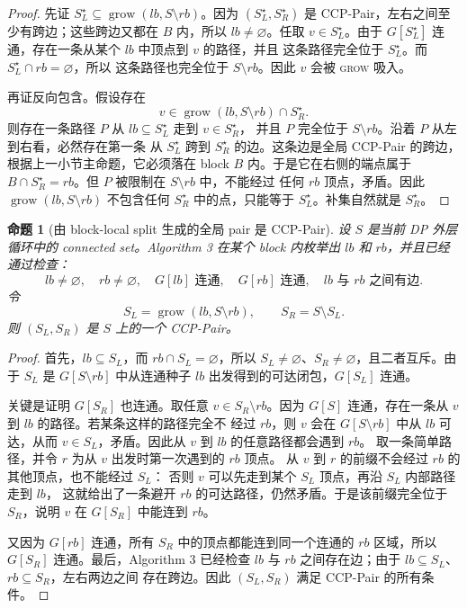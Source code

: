 \documentclass[UTF8]{ctexart}
\newtheorem{proposition}{命题}[section]
\begin{document}
\begin{proof}
先证 \(S_L^\star\subseteq \operatorname{grow}(lb,S\setminus rb)\)。因为
\((S_L^\star,S_R^\star)\) 是 CCP-Pair，左右之间至少有跨边；这些跨边又都在
\(B\) 内，所以 \(lb\neq\varnothing\)。任取 \(v\in S_L^\star\)。由于
\(G[S_L^\star]\) 连通，存在一条从某个 \(lb\) 中顶点到 \(v\) 的路径，并且
这条路径完全位于 \(S_L^\star\)。而 \(S_L^\star\cap rb=\varnothing\)，所以
这条路径也完全位于 \(S\setminus rb\)。因此 \(v\) 会被 \textsc{grow} 吸入。

再证反向包含。假设存在
\[
v\in \operatorname{grow}(lb,S\setminus rb)\cap S_R^\star.
\]
则存在一条路径 \(P\) 从 \(lb\subseteq S_L^\star\) 走到 \(v\in S_R^\star\)，
并且 \(P\) 完全位于 \(S\setminus rb\)。沿着 \(P\) 从左到右看，必然存在第一条
从 \(S_L^\star\) 跨到 \(S_R^\star\) 的边。这条边是全局 CCP-Pair 的跨边，
根据上一小节主命题，它必须落在 block \(B\) 内。于是它在右侧的端点属于
\(B\cap S_R^\star=rb\)。但 \(P\) 被限制在 \(S\setminus rb\) 中，不能经过
任何 \(rb\) 顶点，矛盾。因此 \(\operatorname{grow}(lb,S\setminus rb)\)
不包含任何 \(S_R^\star\) 中的点，只能等于 \(S_L^\star\)。补集自然就是
\(S_R^\star\)。
\end{proof}

\begin{proposition}[由 block-local split 生成的全局 pair 是 CCP-Pair]
设 \(S\) 是当前 DP 外层循环中的 connected set。Algorithm 3 在某个 block
内枚举出 \(lb\) 和 \(rb\)，并且已经通过检查：
\[
lb\neq\varnothing,\quad rb\neq\varnothing,\quad
G[lb]\text{ 连通},\quad G[rb]\text{ 连通},\quad
lb\text{ 与 }rb\text{ 之间有边}.
\]
令
\[
S_L=\operatorname{grow}(lb,S\setminus rb),\qquad S_R=S\setminus S_L.
\]
则 \((S_L,S_R)\) 是 \(S\) 上的一个 CCP-Pair。
\end{proposition}

\begin{proof}
首先，\(lb\subseteq S_L\)，而 \(rb\cap S_L=\varnothing\)，所以
\(S_L\neq\varnothing\)、\(S_R\neq\varnothing\)，且二者互斥。由于 \(S_L\)
是 \(G[S\setminus rb]\) 中从连通种子 \(lb\) 出发得到的可达闭包，\(G[S_L]\)
连通。

关键是证明 \(G[S_R]\) 也连通。取任意 \(v\in S_R\setminus rb\)。因为
\(G[S]\) 连通，存在一条从 \(v\) 到 \(lb\) 的路径。若某条这样的路径完全不
经过 \(rb\)，则 \(v\) 会在 \(G[S\setminus rb]\) 中从 \(lb\) 可达，从而
\(v\in S_L\)，矛盾。因此从 \(v\) 到 \(lb\) 的任意路径都会遇到 \(rb\)。
取一条简单路径，并令 \(r\) 为从 \(v\) 出发时第一次遇到的 \(rb\) 顶点。
从 \(v\) 到 \(r\) 的前缀不会经过 \(rb\) 的其他顶点，也不能经过 \(S_L\)：
否则 \(v\) 可以先走到某个 \(S_L\) 顶点，再沿 \(S_L\) 内部路径走到 \(lb\)，
这就给出了一条避开 \(rb\) 的可达路径，仍然矛盾。于是该前缀完全位于
\(S_R\)，说明 \(v\) 在 \(G[S_R]\) 中能连到 \(rb\)。

又因为 \(G[rb]\) 连通，所有 \(S_R\) 中的顶点都能连到同一个连通的 \(rb\)
区域，所以 \(G[S_R]\) 连通。最后，Algorithm 3 已经检查 \(lb\) 与 \(rb\)
之间存在边；由于 \(lb\subseteq S_L\)、\(rb\subseteq S_R\)，左右两边之间
存在跨边。因此 \((S_L,S_R)\) 满足 CCP-Pair 的所有条件。
\end{proof}
\end{document}
